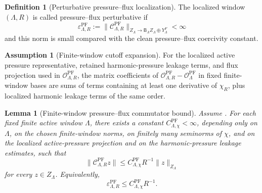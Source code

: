 \documentclass[11pt]{article}
\numberwithin{equation}{section}
\theoremstyle{plain}
\newtheorem{lemma}[theorem]{Lemma}
\theoremstyle{definition}
\newtheorem{definition}[theorem]{Definition}
\newtheorem{assumption}[theorem]{Assumption}
\theoremstyle{remark}
\newcommand{\PF}{\mathrm{PF}}
\newcommand{\calC}{\mathcal C}
\newcommand{\calO}{\mathcal O}
\newcommand{\Bop}{\mathsf B}
\begin{document}
\begin{definition}[Perturbative pressure--flux localization]
\label{def:pf-perturbative-localization}
The localized window \((\Lambda,R)\) is called pressure--flux perturbative if
\[
        \varepsilon^{\PF}_{\Lambda,R}
        :=
        \|\calC^{\PF}_{\Lambda,R}\|_{Z_\Lambda\to \Bop_\Lambda Z_\Lambda\oplus Y^F_\Lambda}
        <\infty
\]
and this norm is small compared with the clean pressure--flux coercivity constant.
\end{definition}

\begin{assumption}[Finite-window cutoff expansion]
\label{ass:finite-window-cutoff-expansion}
For the localized active pressure representative, retained harmonic-pressure leakage terms, and flux projection used in \(\calO^{\PF}_{\Lambda,R}\), the matrix coefficients of \(\calO^{\PF}_{\Lambda,R}-\calO^{\PF}_\Lambda\) in fixed finite-window bases are sums of terms containing at least one derivative of \(\chi_R\), plus localized harmonic leakage terms of the same order.
\end{assumption}

\begin{lemma}[Finite-window pressure--flux commutator bound]
\label{lem:pf-localization-commutator}
Assume .  For each fixed finite active window \(\Lambda\), there exists a constant \(C^{\PF}_{\Lambda,\chi}<\infty\), depending only on \(\Lambda\), on the chosen finite-window norms, on finitely many seminorms of \(\chi\), and on the localized active-pressure projection and on the harmonic-pressure leakage estimates, such that
\begin{equation}
        \|\calC^{\PF}_{\Lambda,R}z\|
        \le
        C^{\PF}_{\Lambda,\chi}R^{-1}\|z\|_{Z_\Lambda}
        \label{eq:pf-commutator-bound}
\end{equation}
for every \(z\in Z_\Lambda\).  Equivalently,
\[
        \varepsilon^{\PF}_{\Lambda,R}
        \le
        C^{\PF}_{\Lambda,\chi}R^{-1}.
\]
\end{lemma}
\end{document}

